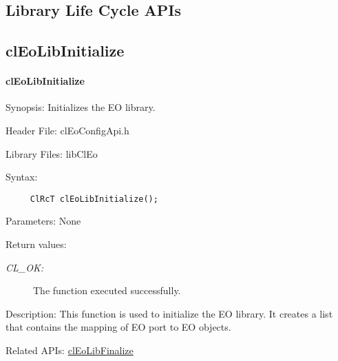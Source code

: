 \begin{flushleft}
 
  \newpage


\section{Library Life Cycle APIs}
\subsection{clEoLibInitialize}
\hypertarget{pageeo201}{}\paragraph{cl\-Eo\-Lib\-Initialize}\label{pageeo201}
\begin{Desc}
\item[Synopsis:]Initializes the EO library.\end{Desc}
\begin{Desc}
\item[Header File:]clEoConfigApi.h\end{Desc}
\begin{Desc}
\item[Library Files:]lib\-Cl\-Eo\end{Desc}
\begin{Desc}
\item[Syntax:]

\footnotesize\begin{verbatim}     ClRcT clEoLibInitialize();
\end{verbatim}
  \normalsize
\end{Desc}
\begin{Desc}
\item[Parameters:]None\end{Desc}
\begin{Desc}
\item[Return values:]
\begin{description}
\item[{\em CL\_\-OK:}]The function executed successfully.\end{description}
\end{Desc}
\begin{Desc}
\item[Description:]This function is used to initialize the EO library. It creates a list that contains the mapping of EO port to EO objects.
\end{Desc}
\begin{Desc}
\item[Related APIs:]\hyperlink{pageeo202}{clEoLibFinalize}\end{Desc}





\end{flushleft}

